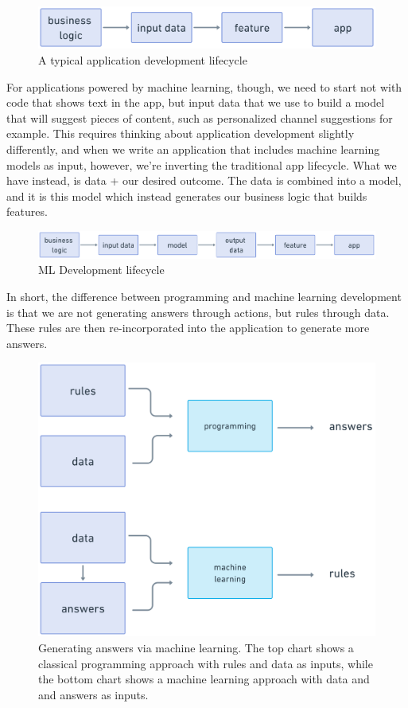 \documentclass[11pt, table]{diazessay} %
\begin{document}
\begin{sloppypar}
\begin{figure}[H]
\centering
\includegraphics[width=.75\textwidth]{figures/app_flow.png}
\caption{A typical application development lifecycle}
\end{figure}

For applications powered by machine learning, though, we need to start not with code that shows text in the app, but input data that we use to build a model that will suggest pieces of content, such as personalized channel suggestions for example. This requires thinking about application development slightly differently, and when we write an application that includes machine learning models as input, however, we’re inverting the traditional app lifecycle. What we have instead, is data + our desired outcome. The data is combined into a model, and it is this model which instead generates our business logic that builds features. 

\begin{figure}[H]
\centering
\includegraphics[width=.95\textwidth]{figures/ml-flow.png}
\caption{ML Development lifecycle}
\end{figure}

In short, the difference between programming and machine learning development is that we are not generating answers through actions, but rules through data. These rules are then re-incorporated into the application to generate more answers. 

\begin{figure}[H]
\centering
\includegraphics[width=.75\textwidth]{figures/rules_ml.png}
\caption{Generating answers via machine learning. The top chart shows a classical programming approach with rules and data as inputs, while the bottom chart shows a machine learning approach with data and and answers as inputs. \citep{chollet2021deep}}
\end{figure}


\end{sloppypar}
\end{document}
